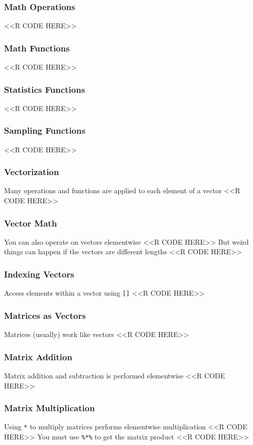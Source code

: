\documentclass{beamer}
\begin{document}
\begin{frame}[fragile]\frametitle{Math Operations}
    <<R CODE HERE>>
\end{frame}

\begin{frame}[fragile]\frametitle{Math Functions}
    <<R CODE HERE>>
\end{frame}

\begin{frame}[fragile]\frametitle{Statistics Functions}
    <<R CODE HERE>>
\end{frame}

\begin{frame}[fragile]\frametitle{Sampling Functions}
    <<R CODE HERE>>
\end{frame}

\begin{frame}[fragile]\frametitle{Vectorization}
    Many operations and functions are applied to each element of a vector
    <<R CODE HERE>>
\end{frame}

\begin{frame}[fragile]\frametitle{Vector Math}
    You can also operate on vectors elementwise
    <<R CODE HERE>>
    \vspace{3ex}
    But weird things can happen if the vectors are different lengths
    <<R CODE HERE>>
\end{frame}

\begin{frame}[fragile]\frametitle{Indexing Vectors}
    Access elements within a vector using \texttt{[]}
    <<R CODE HERE>>
\end{frame}

\begin{frame}[fragile]\frametitle{Matrices as Vectors}
    Matrices (usually) work like vectors
    <<R CODE HERE>>
\end{frame}

\begin{frame}[fragile]\frametitle{Matrix Addition}
    Matrix addition and subtraction is performed elementwise
    <<R CODE HERE>>
\end{frame}

\begin{frame}[fragile]\frametitle{Matrix Multiplication}
    Using \texttt{*} to multiply matrices performs elementwise multiplication
    <<R CODE HERE>>
    \vspace{3ex}
    You must use \texttt{\%*\%} to get the matrix product
    <<R CODE HERE>>
\end{frame}
\end{document}
